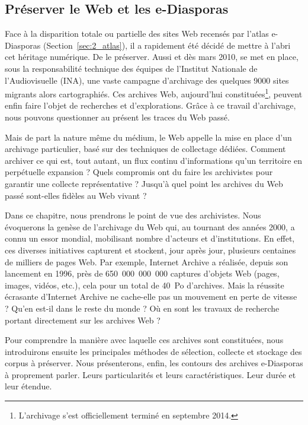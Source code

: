 \documentclass[symmetric,justified,marginals=raggedouter]{tufte-book}
\begin{document}
\cleardoublepage
\begin{minipage}[t,leftmargin=5em]{1.5\linewidth}%
\begin{adjustwidth}{-0.5cm}{}
\chapter{Préserver le Web et les e-Diasporas}
\label{chap:3}
\end{adjustwidth}
\end{minipage}
\hfill

\noindent Face à la disparition totale ou partielle des sites Web recensés par l'atlas e-Diasporas (Section~\ref{sec:2_atlas}), il a rapidement été décidé de mettre à l'abri cet héritage numérique. De le préserver. Aussi et dès mars 2010, se met en place, sous la responsabilité technique des équipes de l'Institut Nationale de l'Audiovisuelle (INA), une vaste campagne d'archivage des quelques 9000 sites migrants alors cartographiés. Ces archives Web, aujourd'hui constituées\footnote{\RaggedOuter L'archivage s'est officiellement terminé en septembre 2014.}, peuvent enfin faire l'objet de recherches et d'explorations. Grâce à ce travail d'archivage, nous pouvons questionner au présent les traces du Web passé. 

Mais de part la nature même du médium, le Web appelle la mise en place d'un archivage particulier, basé sur des techniques de collectage dédiées. Comment archiver ce qui est, tout autant, un flux continu d'informations qu'un territoire en perpétuelle expansion ? Quels compromis ont du faire les archivistes pour garantir une collecte représentative ? Jusqu'à quel point les archives du Web passé sont-elles fidèles au Web vivant ? 

Dans ce chapitre, nous prendrons le point de vue des archivistes. Nous évoquerons la genèse de l'archivage du Web qui, au tournant des années 2000, a connu un essor mondial, mobilisant nombre d'acteurs et d'institutions. En effet, ces diverses initiatives capturent et stockent, jour après jour, plusieurs centaines de milliers de pages Web. Par exemple, Internet Archive a réalisée, depuis son lancement en 1996, près de 650~000~000~000 captures d'objets Web (pages, images, vidéos, etc.), cela pour un total de 40~Po d'archives. Mais la réussite écrasante d'Internet Archive ne cache-elle pas un mouvement en perte de vitesse ? Qu'en est-il dans le reste du monde ? Où en sont les travaux de recherche portant directement sur les archives Web ?

Pour comprendre la manière avec laquelle ces archives sont constituées, nous introduirons ensuite les principales méthodes de sélection, collecte et stockage des corpus à préserver. Nous présenterons, enfin, les contours des archives e-Diaspo\-ras à proprement parler. Leurs particularités et leurs caractéristiques. Leur durée et leur étendue.
\end{document}
